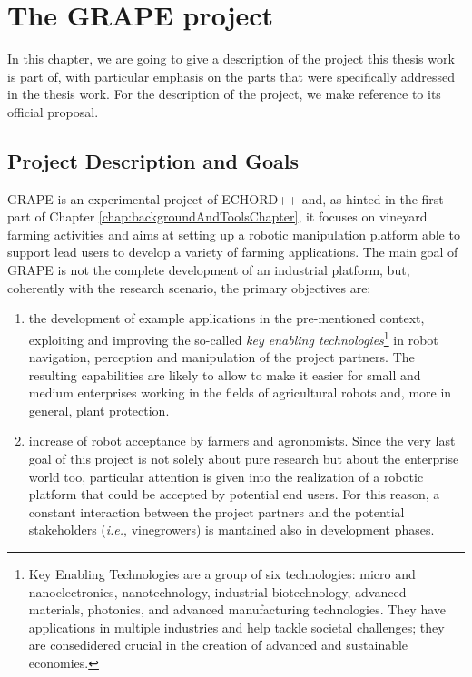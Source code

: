 \chapter{The GRAPE project} \label{chap:grapeProject}

In this chapter, we are going to give a description of the project this thesis work is part of, with particular emphasis on the parts that were specifically addressed in the thesis work. For the description of the project, we make reference to its official proposal.

\section{Project Description and Goals} \label{sec:grapeProjectDescription}
\ac{GRAPE} is an experimental project of \ac{ECHORD++} and, as hinted in the first part of Chapter \ref{chap:backgroundAndToolsChapter}, it focuses on vineyard farming activities and aims at setting up a robotic manipulation platform able to support lead users to develop a variety of farming applications.
The main goal of \ac{GRAPE} is not the complete development of an industrial platform, but, coherently with the research scenario, the primary objectives are:
\begin{enumerate}
	\item the development of example applications in the pre-mentioned context, exploiting and improving the so-called \textit{key enabling technologies}\footnote{Key Enabling Technologies are a group of six technologies: micro and nanoelectronics, nanotechnology, industrial biotechnology, advanced materials, photonics, and advanced manufacturing technologies. They have applications in multiple industries and help tackle societal challenges; they are consedidered crucial in the creation of advanced and sustainable economies.} 
in robot navigation, perception and manipulation of the project partners. The resulting capabilities are likely to allow to make it easier for small and medium enterprises working in the fields of agricultural robots and, more in general, plant protection.
	\item increase of robot acceptance by farmers and agronomists. Since the very last goal of this project is not solely about pure research but about the enterprise world too, particular attention is given into the realization of a robotic platform that could be accepted by potential end users. For this reason, a constant interaction between the project partners and the potential stakeholders (\textit{i.e.}, vinegrowers) is mantained also in development phases.
\end{enumerate}

